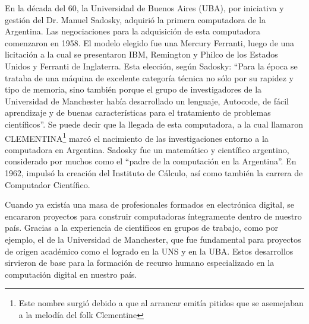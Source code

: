 \documentclass[%
 	final,
%
	notitlepage,
	narroweqnarray,
	inline,
 	twoside,
	]{ieee}
\begin{document}
En la d\'ecada del 60, la Universidad de Buenos Aires (UBA), por iniciativa y gesti\'on del Dr. Manuel Sadosky\cite{sadosky}, adquiri\'o la primera computadora de la Argentina.
Las negociaciones para la adquisici\'on de esta computadora comenzaron en 1958. El modelo elegido fue una Mercury Ferranti, luego de una licitaci\'on a la cual se presentaron IBM, Remington y Philco de los Estados Unidos y Ferranti de Inglaterra. Esta elecci\'on, seg\'un Sadosky: ``Para la \'epoca se trataba de una m\'aquina de excelente categor\'ia t\'ecnica no s\'olo por su rapidez y tipo de memoria, sino tambi\'en porque el grupo de investigadores de la Universidad de Manchester hab\'ia desarrollado un lenguaje, Autocode, de f\'acil aprendizaje y de buenas caracter\'isticas para el tratamiento de problemas cient\'ificos''.
Se puede decir que la llegada de esta computadora, a la cual llamaron CLEMENTINA\footnote{Este nombre surgi\'o debido a que al arrancar emit\'ia pitidos que se asemejaban a la melod\'ia del folk Clementine} marc\'o el nacimiento de las investigaciones entorno a la computadora en Argentina.
Sadosky fue un matem\'atico y cient\'ifico argentino, considerado por muchos como el ``padre de la computaci\'on en la Argentina''.
En 1962, impuls\'o la creaci\'on del Instituto de C\'alculo, as\'i como tambi\'en la carrera de Computador Cient\'ifico.

Cuando ya exist\'ia una masa de profesionales formados en electr\'onica digital, se encararon proyectos para construir computadoras \'integramente dentro de nuestro pa\'is. Gracias a la experiencia de cientificos en grupos de trabajo, como por ejemplo, el de la Universidad de Manchester, que fue fundamental para proyectos de origen acad\'emico como el logrado en la UNS y en la UBA. Estos desarrollos sirvieron de base para la formaci\'on de recurso humano especializado en la computaci\'on digital en nuestro pa\'is.



\end{document}
